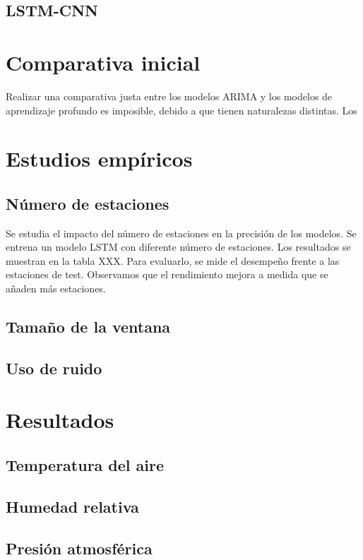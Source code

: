 \subsection{LSTM-CNN}


\section{Comparativa inicial}
Realizar una comparativa justa entre los modelos ARIMA y los modelos de aprendizaje profundo es imposible, debido a que tienen naturalezas distintas.
Los 

\section{Estudios empíricos}

\subsection{Número de estaciones}
Se estudia el impacto del número de estaciones en la precisión de los modelos. Se entrena un modelo LSTM con diferente número de estaciones. Los resultados se muestran en la tabla XXX.
Para evaluarlo, se mide el desempeño frente a las estaciones de test. Observamos que el rendimiento mejora a medida que se añaden más estaciones.

\subsection{Tamaño de la ventana}

\subsection{Uso de ruido}

\section{Resultados}
\subsection{Temperatura del aire}
\subsection{Humedad relativa}
\subsection{Presión atmosférica}

